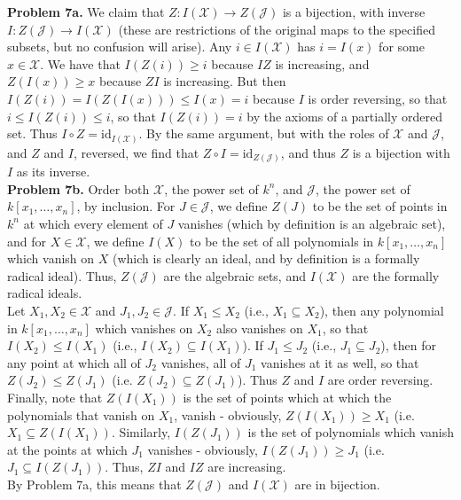 \documentclass[11pt]{article}
\newcommand{\num}[1]{\noindent \textbf{#1}}
\theoremstyle{definition}
\begin{document}
\num{Problem 7a.}  We claim that $Z:I(\mathcal{X})\rightarrow Z(\mathcal{J})$
is a bijection, with inverse $I:Z(\mathcal{J})\rightarrow I(\mathcal{X})$
(these are restrictions of the original maps to the specified subsets, but
no confusion will arise). Any $i\in I(\mathcal{X})$ has $i=I(x)$ for some
$x\in\mathcal{X}$. We have that $I(Z(i))\geq i$ because $IZ$ is increasing, and
$Z(I(x))\geq x$ because $ZI$ is increasing. But then $I(Z(i))= I(Z(I(x)))\leq
I(x) = i$ because $I$ is order reversing, so that $i\leq I(Z(i))\leq i$,
so that $I(Z(i))=i$ by the axioms of a partially ordered set. Thus $I\circ
Z = \text{id}_{I(\mathcal{X})}$. By the same argument, but with the roles
of $\mathcal{X}$ and $\mathcal{J}$, and $Z$ and $I$, reversed, we find that
$Z\circ I = \text{id}_{Z(\mathcal{J})}$, and thus $Z$ is a bijection with $I$
as its inverse.\\

\num{Problem 7b.} Order both $\mathcal{X}$, the power set of $k^n$, and
$\mathcal{J}$, the power set of $k[x_1,\ldots,x_n]$, by inclusion. For
$J\in\mathcal{J}$, we define $Z(J)$ to be the set of points in $k^n$ at which
every element of $J$ vanishes (which by definition is an algebraic set),
and for $X\in\mathcal{X}$, we define $I(X)$ to be the set of all polynomials
in $k[x_1,\ldots,x_n]$ which vanish on $X$ (which is clearly an ideal, and
by definition is a formally radical ideal). Thus, $Z(\mathcal{J})$ are the
algebraic sets, and $I(\mathcal{X})$ are the formally radical ideals. \\

Let $X_1,X_2\in\mathcal{X}$ and $J_1,J_2\in\mathcal{J}$. If $X_1\leq X_2$
(i.e., $X_1\subseteq X_2$), then any polynomial in $k[x_1,\ldots,x_n]$ which
vanishes on $X_2$ also vanishes on $X_1$, so that $I(X_2)\leq I(X_1)$ (i.e.,
$I(X_2)\subseteq I(X_1)$). If $J_1\leq J_2$ (i.e., $J_1\subseteq J_2$), then
for any point at which all of $J_2$ vanishes, all of $J_1$ vanishes at it as
well, so that $Z(J_2)\leq Z(J_1)$ (i.e. $Z(J_2)\subseteq Z(J_1)$). Thus $Z$
and $I$ are order reversing. Finally, note that $Z(I(X_1))$ is the set of
points which at which the polynomials that vanish on $X_1$, vanish - obviously,
$Z(I(X_1))\geq X_1$ (i.e. $X_1\subseteq Z(I(X_1))$. Similarly, $I(Z(J_1))$
is the set of polynomials which vanish at the points at which $J_1$ vanishes
- obviously, $I(Z(J_1))\geq J_1$ (i.e. $J_1\subseteq I(Z(J_1))$. Thus, $ZI$
and $IZ$ are increasing. \\

By Problem 7a, this means that $Z(\mathcal{J})$ and $I(\mathcal{X})$ are in
bijection.\\
\end{document}
